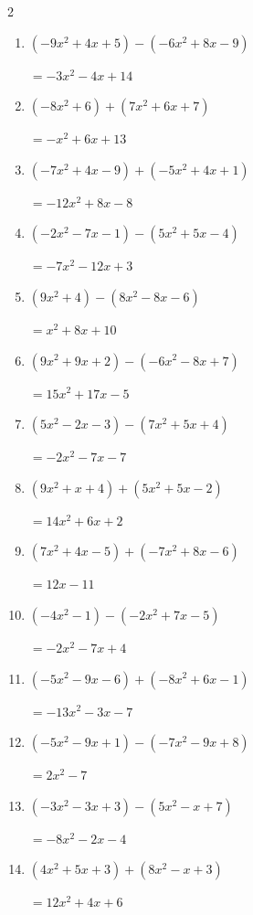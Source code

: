 \begin{multicols}{2}
\begin{enumerate}
        $=-3x^{2}+8x+4$

  \item $(-9x^{2}+4x+5)-(-6x^{2}+8x-9)$

        $=-3x^{2}-4x+14$

  \item $(-8x^{2}+6)+(7x^{2}+6x+7)$

        $=-x^{2}+6x+13$

  \item $(-7x^{2}+4x-9)+(-5x^{2}+4x+1)$

        $=-12x^{2}+8x-8$

  \item $(-2x^{2}-7x-1)-(5x^{2}+5x-4)$

        $=-7x^{2}-12x+3$

  \item $(9x^{2}+4)-(8x^{2}-8x-6)$

        $=x^{2}+8x+10$

  \item $(9x^{2}+9x+2)-(-6x^{2}-8x+7)$

        $=15x^{2}+17x-5$

  \item $(5x^{2}-2x-3)-(7x^{2}+5x+4)$

        $=-2x^{2}-7x-7$

  \item $(9x^{2}+x+4)+(5x^{2}+5x-2)$

        $=14x^{2}+6x+2$

  \item $(7x^{2}+4x-5)+(-7x^{2}+8x-6)$

        $=12x-11$

  \item $(-4x^{2}-1)-(-2x^{2}+7x-5)$

        $=-2x^{2}-7x+4$

  \item $(-5x^{2}-9x-6)+(-8x^{2}+6x-1)$

        $=-13x^{2}-3x-7$

  \item $(-5x^{2}-9x+1)-(-7x^{2}-9x+8)$

        $=2x^{2}-7$

  \item $(-3x^{2}-3x+3)-(5x^{2}-x+7)$

        $=-8x^{2}-2x-4$

  \item $(4x^{2}+5x+3)+(8x^{2}-x+3)$

        $=12x^{2}+4x+6$


\end{enumerate}
\end{multicols}
